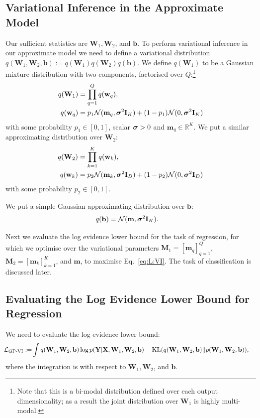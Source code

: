 \documentclass{article} %
\newcommand{\R}{\mathbb{R}}
\newcommand{\N}{\mathcal{N}}
\newcommand{\cL}{\mathcal{L}}
\newcommand{\Bb}{\mathbf{b}}
\newcommand{\w}{\mathbf{w}}
\newcommand{\W}{\mathbf{W}}
\newcommand{\m}{\mathbf{m}}
\newcommand{\X}{\mathbf{X}}
\newcommand{\Y}{\mathbf{Y}}
\newcommand{\I}{\mathbf{I}}
\newcommand{\M}{\mathbf{M}}
\newcommand{\bsigma}{\text{\boldmath$\sigma$}}
\newcommand{\KL}{\text{KL}}
\theoremstyle{definition}
\begin{document}
\subsection{Variational Inference in the Approximate Model}
Our sufficient statistics are $\W_1, \W_2$, and $\Bb$.
To perform variational inference in our approximate model we need to define a variational distribution $q(\W_1, \W_2, \Bb) :=q (\W_1)q(\W_2)q(\Bb)$. We define $q(\W_1)$ to be a Gaussian mixture distribution with two components, factorised over $Q$:\footnote{Note that this is a bi-modal distribution defined over each output dimensionality; as a result the joint distribution over $\W_1$ is highly multi-modal.}
\begin{align} \label{eq:variaitonal_dist_1}
q(\W_1) &= \prod_{q=1}^Q q(\w_q), \\
q(\w_q) &= p_1 \N(\m_q, \bsigma^2 \I_K) + (1-p_1) \N(0, \bsigma^2 \I_K) \notag
\end{align}
with some probability $p_1 \in [0, 1]$, scalar $\bsigma > 0$ and $\m_q \in \R^K$. We put a similar approximating distribution over $\W_2$:
\begin{align} \label{eq:variaitonal_dist_2}
q(\W_2) &= \prod_{k=1}^K q(\w_k), \\
q(\w_k) &= p_2 \N(\m_k, \bsigma^2 \I_D) + (1-p_2) \N(0, \bsigma^2 \I_D) \notag
\end{align}
with some probability $p_2 \in [0, 1]$.

We put a simple Gaussian approximating distribution over $\Bb$:
\begin{align} \label{eq:variaitonal_dist_3}
q(\Bb) &= \N(\m, \bsigma^2 \I_K).
\end{align}

Next we evaluate the log evidence lower bound for the task of regression, for which we optimise over the variational parameters $\M_1 = [\m_q]_{q=1}^{Q}$, $\M_2 = [\m_k]_{k=1}^K$, and $\m$, to maximise Eq.\ \eqref{eq:L:VI}. The task of classification is discussed later.

\subsection{Evaluating the Log Evidence Lower Bound for Regression}

We need to evaluate the log evidence lower bound:
\begin{align} \label{eq:L:GP-VI}
\hspace{-1mm}
\cL_{\text{GP-VI}} := &\int q(\W_1, \W_2, \Bb) \log p(\Y | \X, \W_1, \W_2, \Bb) - \KL(q(\W_1, \W_2, \Bb) || p(\W_1, \W_2, \Bb)),
\end{align}
where the integration is with respect to $\W_1, \W_2$, and $\Bb$.
\end{document}
